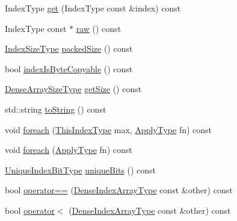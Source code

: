 \begin{DoxyCompactItemize}
Index\+Type \hyperlink{structvt_1_1index_1_1_dense_index_array_aab1b5d089af92c070f2327bc15006251}{get} (Index\+Type const \&index) const
\item 
Index\+Type const  $\ast$ \hyperlink{structvt_1_1index_1_1_dense_index_array_a2bde995d206bb72e0f5973a78e100eea}{raw} () const
\item 
\hyperlink{structvt_1_1index_1_1_dense_index_array_ae2999552165f16fc69a2940e0589819f}{Index\+Size\+Type} \hyperlink{structvt_1_1index_1_1_dense_index_array_aaf03d65faf2c1916de7309f2602ee13a}{packed\+Size} () const
\item 
bool \hyperlink{structvt_1_1index_1_1_dense_index_array_a2c47c2a4cb636879e03281d185e19fad}{index\+Is\+Byte\+Copyable} () const
\item 
\hyperlink{structvt_1_1index_1_1_dense_index_array_a7a66b5cd270377310119da3d0c884224}{Dense\+Array\+Size\+Type} \hyperlink{structvt_1_1index_1_1_dense_index_array_a96f8e639c73347b326a31a750a0f9e2d}{get\+Size} () const
\item 
std\+::string \hyperlink{structvt_1_1index_1_1_dense_index_array_a102b9fa9d7a34a9a6630ab89eb9d8a7f}{to\+String} () const
\item 
void \hyperlink{structvt_1_1index_1_1_dense_index_array_abe8fc4be882d51e37404e44e87da5caa}{foreach} (\hyperlink{structvt_1_1index_1_1_dense_index_array_a6915511f6a82dff2522d6e8c2be20f2a}{This\+Index\+Type} max, \hyperlink{structvt_1_1index_1_1_dense_index_array_ab44b9e5a65d28520268523fbe99f6a9d}{Apply\+Type} fn) const
\item 
void \hyperlink{structvt_1_1index_1_1_dense_index_array_ab4306357a93fe2e34179d6a907f31782}{foreach} (\hyperlink{structvt_1_1index_1_1_dense_index_array_ab44b9e5a65d28520268523fbe99f6a9d}{Apply\+Type} fn) const
\item 
\hyperlink{namespacevt_a913e1f07b5228dd8bb64040dc6dcea14}{Unique\+Index\+Bit\+Type} \hyperlink{structvt_1_1index_1_1_dense_index_array_a41531f28f011127ee1714452dd4debef}{unique\+Bits} () const
\item 
bool \hyperlink{structvt_1_1index_1_1_dense_index_array_aa407d7e96709099c4a7ee179c65c627f}{operator==} (\hyperlink{structvt_1_1index_1_1_dense_index_array_aec95c4ed1b4071d31d24142f02429dbd}{Dense\+Index\+Array\+Type} const \&other) const
\item 
bool \hyperlink{structvt_1_1index_1_1_dense_index_array_a7d1d02c9c0a50822d63afeb3358a7a0f}{operator$<$} (\hyperlink{structvt_1_1index_1_1_dense_index_array_aec95c4ed1b4071d31d24142f02429dbd}{Dense\+Index\+Array\+Type} const \&other) const

\end{DoxyCompactItemize}

